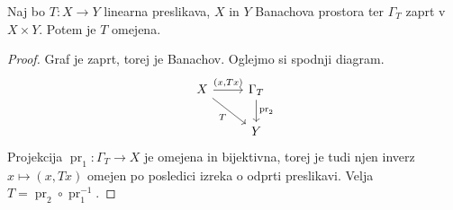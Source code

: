 \begin{izrek}
  Naj bo $T: X \to Y$ linearna preslikava, $X$ in $Y$ Banachova prostora ter
  $\Gamma_T$ zaprt v $X \times Y$.
  Potem je $T$ omejena.
\end{izrek}

\begin{proof}
  Graf je zaprt, torej je Banachov.
  Oglejmo si spodnji diagram.
  \[\begin{tikzcd}
	  X & {\Gamma_T} \\
	  & Y
	  \arrow["{(x, Tx)}", from=1-1, to=1-2]
	  \arrow["T"', from=1-1, to=2-2]
	  \arrow["{\operatorname{pr}_2}", from=1-2, to=2-2]
	\end{tikzcd}\]
  Projekcija $\operatorname{pr}_1: \Gamma_T \to X$ je omejena in bijektivna,
  torej je tudi njen inverz $x \mapsto (x, Tx)$ omejen po posledici izreka o
  odprti preslikavi.
  Velja $T = \operatorname{pr}_2 \circ \operatorname{pr}_1^{-1}$.
\end{proof}

